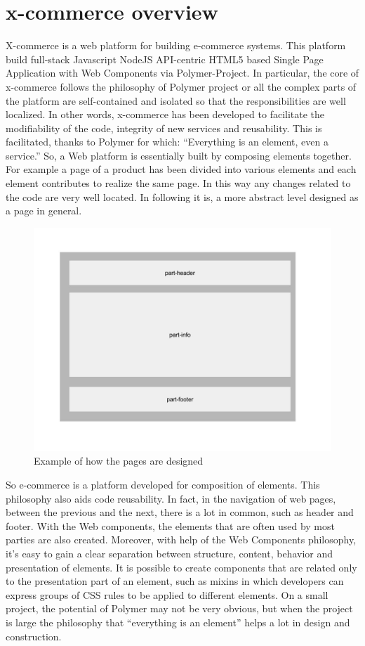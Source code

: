 \section{x-commerce overview}
\label{sec:x_commerce_overview}
X-commerce is a web platform for building e-commerce systems. This platform build full-stack Javascript NodeJS API-centric HTML5 based Single Page Application with Web Components via Polymer-Project. In particular, the core of x-commerce follows the philosophy of Polymer project or all the complex parts of the platform are self-contained and isolated so that the responsibilities are well localized. In other words, x-commerce has been developed to facilitate the modifiability of the code, integrity of new services and reusability. This is facilitated, thanks to Polymer for which: “Everything is an element, even a service.”
So, a Web platform is essentially built by composing elements together.
\newline
For example a page of a product has been divided into various elements and each element contributes to realize the same page. In this way any changes related to the code are very well located. In following it is, a more abstract level designed as a page in general.
\begin{figure}[htb]
 \centering
 \includegraphics[width=1.0\linewidth]{images/chapter4/design-page.jpg}\hfill
 \caption[Design page]{Example of how the pages are designed}
 \label{fig:design_page}
\end{figure}
So e-commerce is a platform developed for composition of elements. This philosophy also aids code reusability. In fact, in the navigation of web pages, between the previous and the next, there is a lot in common, such as header and footer. With the Web components, the elements that are often used by most parties are also created.
Moreover, with help of the Web Components philosophy, it’s easy to gain a clear separation between structure, content, behavior and presentation of elements. It is possible to create components that are related only to the presentation part of an element, such as mixins in which developers can express groups of CSS rules to be applied to different elements.
\newline
On a small project, the potential of Polymer may not be very obvious, but when the project is large the philosophy that “everything is an element” helps a lot in design and construction.